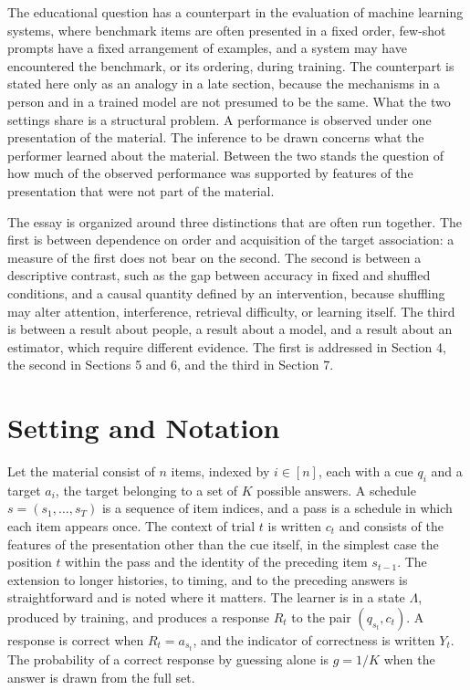 \documentclass[11pt]{article}
\theoremstyle{remark}
\begin{document}
The educational question has a counterpart in the evaluation of machine learning systems, where benchmark items are often presented in a fixed order, few-shot prompts have a fixed arrangement of examples, and a system may have encountered the benchmark, or its ordering, during training. The counterpart is stated here only as an analogy in a late section, because the mechanisms in a person and in a trained model are not presumed to be the same. What the two settings share is a structural problem. A performance is observed under one presentation of the material. The inference to be drawn concerns what the performer learned about the material. Between the two stands the question of how much of the observed performance was supported by features of the presentation that were not part of the material.

The essay is organized around three distinctions that are often run together. The first is between dependence on order and acquisition of the target association: a measure of the first does not bear on the second. The second is between a descriptive contrast, such as the gap between accuracy in fixed and shuffled conditions, and a causal quantity defined by an intervention, because shuffling may alter attention, interference, retrieval difficulty, or learning itself. The third is between a result about people, a result about a model, and a result about an estimator, which require different evidence. The first is addressed in Section 4, the second in Sections 5 and 6, and the third in Section 7.

\section{Setting and Notation}

Let the material consist of $n$ items, indexed by $i \in [n]$, each with a cue $q_i$ and a target $a_i$, the target belonging to a set of $K$ possible answers. A schedule $s = (s_1,\dots,s_T)$ is a sequence of item indices, and a pass is a schedule in which each item appears once. The context of trial $t$ is written $c_t$ and consists of the features of the presentation other than the cue itself, in the simplest case the position $t$ within the pass and the identity of the preceding item $s_{t-1}$. The extension to longer histories, to timing, and to the preceding answers is straightforward and is noted where it matters. The learner is in a state $\Lambda$, produced by training, and produces a response $R_t$ to the pair $(q_{s_t}, c_t)$. A response is correct when $R_t = a_{s_t}$, and the indicator of correctness is written $Y_t$. The probability of a correct response by guessing alone is $g = 1/K$ when the answer is drawn from the full set.
\end{document}
